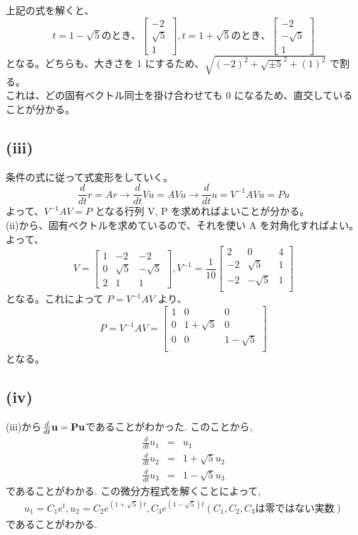 \documentclass[10pt]{jarticle}
\begin{document}
上記の式を解くと、
\[
t = 1 - \sqrt{5} のとき、
\left[
\begin{array}{c}
-2 \\
\sqrt{5} \\
1
\end{array}
\right]
, 
t = 1 + \sqrt{5} のとき、
\left[
\begin{array}{c}
-2 \\
-\sqrt{5} \\
1
\end{array}
\right]
\]
となる。どちらも、大きさを 1 にするため、$\sqrt{(-2)^2 + \sqrt{\pm 5}^2 + (1)^2}$ で割る。\\
これは、どの固有ベクトル同士を掛け合わせても 0 になるため、直交していることが分かる。\\

\subsection*{(iii)}
条件の式に従って式変形をしていく。
\[
\frac{d}{dt}r = Ar \to \frac{d}{dt}Vu = AVu \to \frac{d}{dt}u = V^{-1}AVu = Pu
\]
よって、$V^{-1}AV = P$ となる行列 V, P を求めればよいことが分かる。\\
(ii)から、固有ベクトルを求めているので、それを使い A を対角化すればよい。よって、
\[
V = 
\left[
\begin{array}{ccc}
1 & -2 & -2 \\
0 & \sqrt{5} & -\sqrt{5} \\
2 & 1 & 1
\end{array}
\right]
, V^{-1} = \frac{1}{10}
\left[
\begin{array}{ccc}
2 & 0 & 4 \\
-2 & \sqrt{5} & 1 \\
-2 & -\sqrt{5} & 1\\
\end{array}
\right]
\]
となる。これによって $P = V^{-1}AV$ より、
\[
P = V^{-1}AV = 
\left[
\begin{array}{ccc}
1 & 0 & 0 \\
0 & 1 + \sqrt{5} & 0 \\
0 & 0 & 1 - \sqrt{5}\\
\end{array}
\right]
\]
となる。

\subsection*{(iv)}
(iii)から$\frac{d}{dt}{\bf{u}} = {\bf{P}}{\bf{u}}$であることがわかった. このことから,
\begin{eqnarray}
	\frac{d}{dt}u_1 &=& u_1\\
	\frac{d}{dt}u_2 &=& 1 + \sqrt{5}u_2\\
	\frac{d}{dt}u_3 &=& 1 - \sqrt{5}u_3
\end{eqnarray}
であることがわかる. この微分方程式を解くことによって,
\begin{eqnarray}
	u_1 = C_1e^t, u_2 = C_2e^{(1 + \sqrt{5})t}, C_3e^{(1 - \sqrt{5})t} (C_1, C_2, C_3は零ではない実数)
\end{eqnarray}
であることがわかる. 
\end{document}

